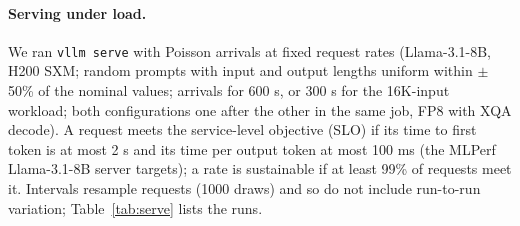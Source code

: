 \documentclass[11pt]{article}
\begin{document}
\paragraph{Serving under load.} We ran \texttt{vllm serve} with Poisson arrivals at fixed request rates (Llama-3.1-8B, H200 SXM; random prompts with input and output lengths uniform within $\pm$50\% of the nominal values; arrivals for 600 s, or 300 s for the 16K-input workload; both configurations one after the other in the same job, FP8 with XQA decode). A request meets the service-level objective (SLO) if its time to first token is at most 2 s and its time per output token at most 100 ms (the MLPerf Llama-3.1-8B server targets); a rate is sustainable if at least 99\% of requests meet it. Intervals resample requests (1000 draws) and so do not include run-to-run variation; Table~\ref{tab:serve} lists the runs.
\end{document}

